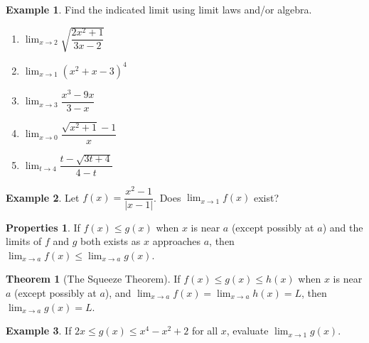 \documentclass{article}
\theoremstyle{definition}
\newtheorem{ex}{Example}[subsection]
\newtheorem*{thm}{Theorem}
\newtheorem*{props}{Properties}
\newcommand*{\dlim}{\displaystyle\lim}
\begin{document}
\begin{ex}
Find the indicated limit using limit laws and/or algebra.
\begin{enumerate}
\item $\dlim_{x\to 2}\sqrt{ \dfrac{ 2x^2 +1}{3x-2} }$
\vspace{1cm}
\item $\dlim_{x\to 1}(x^2+x-3)^4$
\vspace{1cm}
\item $\dlim_{x\to 3}\dfrac{x^3-9x}{3-x}$
\vspace{2cm}
\item $\dlim_{x\to 0}\dfrac{\sqrt{x^2+1}-1}{x}$
\vspace{2cm}
\item $\dlim_{t\to 4}\dfrac{t - \sqrt{3t+4}}{4-t}$
\vspace{2cm}
\end{enumerate}
\end{ex}

\begin{ex}
Let $f(x) = \dfrac{ x^2 - 1}{| x - 1|}$. Does $\dlim_{x\to 1} f(x)$ exist?
\vspace{1.5in}
\end{ex}

\begin{props}
If $f(x)\leq g(x)$ when $x$ is near $a$ (except possibly at $a$) and the limits of $f$ and $g$ both exists as $x$ approaches $a$, then $\dlim_{x\to a}f(x)\leq \dlim_{x\to a}g(x)$.
\end{props}

\begin{thm}[The Squeeze Theorem]
If $f(x)\leq g(x)\leq h(x)$ when $x$ is near $a$ (except possibly at $a$), and $\dlim_{x\to a}f(x)=\dlim_{x\to a}h(x)=L$, then $\dlim_{x\to a}g(x)=L$.
\end{thm}

\begin{ex}
If $2x\leq g(x)\leq x^4-x^2+2$ for all $x$, evaluate $\dlim_{x\to 1}g(x)$.
\end{ex}
\end{document}
